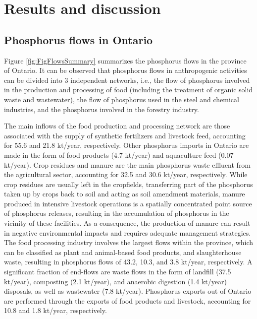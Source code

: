 \documentclass[]{elsarticle}
\begin{document}
\section{Results and discussion}
\subsection{Phosphorus flows in Ontario}

Figure \ref{fig:FigFlowsSummary} summarizes the phosphorus flows in the province of Ontario. It can be observed that phosphorus flows in anthropogenic activities can be divided into 3 independent networks, i.e., the flow of phosphorus involved in the production and processing of food (including the treatment of organic solid waste and  wastewater), the flow of phosphorus used in the steel and chemical industries, and the phosphorus involved in the forestry industry.

The main inflows of the food production and processing network are those associated with the supply of synthetic fertilizers and livestock feed, accounting for 55.6 and 21.8 kt/year, respectively. Other phosphorus imports in Ontario are made in the form of food products (4.7 kt/year) and aquaculture feed (0.07 kt/year). Crop residues and manure are the main phosphorus waste effluent from the agricultural sector, accounting for 32.5 and 30.6 kt/year, respectively.
While crop residues are usually left in the cropfields, transferring part of the phosphorus taken up by crops back to soil and acting as soil amendment materials,
manure produced in intensive livestock operations is a spatially concentrated point source of phosphorus releases, resulting in the accumulation of phosphorus in the vicinity of these facilities. As a consequence, the production of manure can result in negative environmental impacts and requires adequate management strategies. The food processing industry involves the largest flows within the province, which can be classified as plant and animal-based food products, and slaughterhouse waste, resulting in phosphorus flows of 43.2, 10.3, and 3.8 kt/year, respectively. A significant fraction of end-flows are waste flows in the form of landfill (37.5 kt/year), composting (2.1 kt/year), and anaerobic digestion (1.4 kt/year) disposals, as well as wastewater (7.8 kt/year). Phosphorus exports out of Ontario are performed through the exports of food products and livestock, accounting for 10.8 and 1.8 kt/year, respectively.
\end{document}
